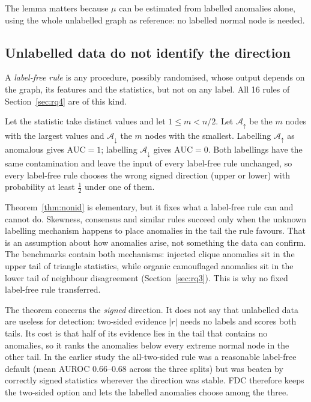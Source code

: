 The lemma matters because $\mu$ can be estimated from labelled anomalies alone, using the whole unlabelled graph as reference: no labelled normal node is needed.

\subsection{Unlabelled data do not identify the direction}

A \emph{label-free rule} is any procedure, possibly randomised, whose output depends on the graph, its features and the statistics, but not on any label. All 16 rules of Section~\ref{sec:rq4} are of this kind.

\begin{theorem}\label{thm:nonid}
Let the statistic take distinct values and let $1 \le m < n/2$. Let $\mathcal{A}_{\uparrow}$ be the $m$ nodes with the largest values and $\mathcal{A}_{\downarrow}$ the $m$ nodes with the smallest. Labelling $\mathcal{A}_{\uparrow}$ as anomalous gives $\mathrm{AUC} = 1$; labelling $\mathcal{A}_{\downarrow}$ gives $\mathrm{AUC} = 0$. Both labellings have the same contamination and leave the input of every label-free rule unchanged, so every label-free rule chooses the wrong signed direction (upper or lower) with probability at least $\tfrac12$ under one of them.
\end{theorem}

Theorem~\ref{thm:nonid} is elementary, but it fixes what a label-free rule can and cannot do. Skewness, consensus and similar rules succeed only when the unknown labelling mechanism happens to place anomalies in the tail the rule favours. That is an assumption about how anomalies arise, not something the data can confirm. The benchmarks contain both mechanisms: injected clique anomalies sit in the upper tail of triangle statistics, while organic camouflaged anomalies sit in the lower tail of neighbour disagreement (Section~\ref{sec:rq3}). This is why no fixed label-free rule transferred.

\begin{remark}\label{rem:scope}
The theorem concerns the \emph{signed} direction. It does not say that unlabelled data are useless for detection: two-sided evidence $|r|$ needs no labels and scores both tails. Its cost is that half of its evidence lies in the tail that contains no anomalies, so it ranks the anomalies below every extreme normal node in the other tail. In the earlier study the all-two-sided rule was a reasonable label-free default (mean AUROC 0.66--0.68 across the three splits) but was beaten by correctly signed statistics wherever the direction was stable. FDC therefore keeps the two-sided option and lets the labelled anomalies choose among the three.
\end{remark}

